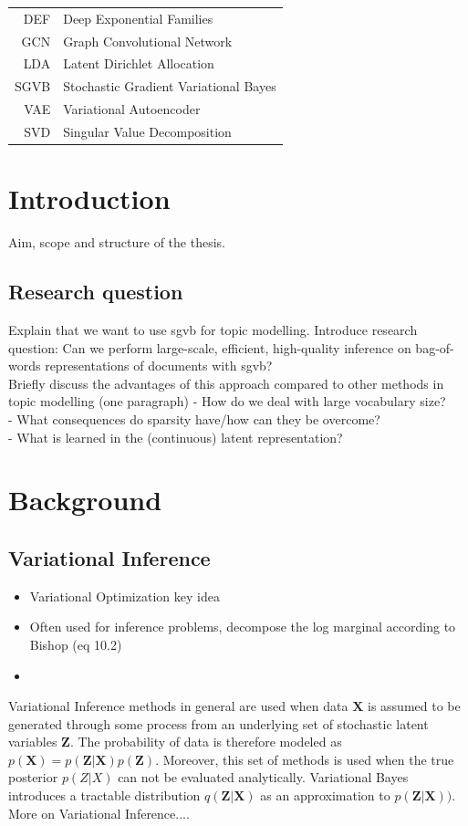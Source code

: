 \documentclass{report}
\begin{document}
\begin{tabular}{r l}
	\hspace{10mm} 
	DEF & Deep Exponential Families \\
	GCN & Graph Convolutional Network \\
	LDA & Latent Dirichlet Allocation \\
	SGVB & Stochastic Gradient Variational Bayes \\
	VAE & Variational Autoencoder \\
	SVD & Singular Value Decomposition \\
\end{tabular}

\tableofcontents

\doublespacing

\chapter{Introduction}
Aim, scope and structure of the thesis. 
\section{Research question}
Explain that we want to use sgvb for topic modelling. Introduce research question:
Can we perform large-scale, efficient, high-quality inference on bag-of-words representations of documents with sgvb? \\
Briefly discuss the advantages of this approach compared to other methods in topic modelling (one paragraph)
-	How do we deal with large vocabulary size?\\
-	What consequences do sparsity have/how can they be overcome? \\
-	What is learned in the (continuous) latent representation?



\pagebreak 
\nocite{*}


\chapter{Background}
\section{Variational Inference}
\begin{itemize}
	\item Variational Optimization key idea
	\item Often used for inference problems, decompose the log marginal according to Bishop (eq 10.2)
	\item 
\end{itemize}
Variational Inference methods in general are used when data $\mathbf{X}$ is assumed to be generated through some process from an underlying set of stochastic latent variables $\mathbf{Z}$. The probability of data is therefore modeled as $p(\mathbf{X}) = p(\mathbf{Z}|\mathbf{X})p(\mathbf{Z})$. Moreover, this set of methods is used when the true posterior $p(Z|X)$ can not be evaluated analytically. Variational Bayes introduces a tractable distribution $q(\mathbf{\mathbf{Z}|\mathbf{X}})$ as an approximation to $p(\mathbf{Z}|\mathbf{X}))$.
\\
More on Variational Inference....
\end{document}
